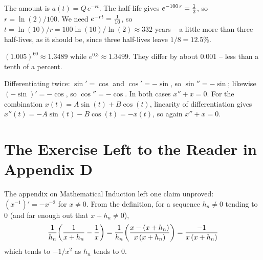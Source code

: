  The amount is $a(t) = Q\, e^{-r t}$. The half-life gives
$e^{-100\, r} = {1 \over 2}$, so $r = \ln(2)/100$. We need
$e^{-r t} = {1 \over 10}$, so
$t = \ln(10)/r = 100 \ln(10)/\ln(2) \approx 332$ years -- a little more
than three half-lives, as it should be, since three half-lives leave
$1/8 = 12.5$\%.

 $(1.005)^{60} \approx 1.3489$ while $e^{0.3} \approx 1.3499$. They
differ by about $0.001$ -- less than a tenth of a percent.

 Differentiating twice: $\sin' = \cos$ and $\cos' = -\sin$, so
$\sin'' = -\sin$; likewise $(-\sin)' = -\cos$, so
$\cos'' = -\cos$. In both cases $x'' + x = 0$. For the combination
$x(t) = A \sin(t) + B \cos(t)$, linearity of differentiation gives
$x''(t) = -A \sin(t) - B \cos(t) = -x(t)$, so again $x'' + x = 0$.

\section{The Exercise Left to the Reader in Appendix D}
The appendix on Mathematical Induction left one claim unproved:
$(x^{-1})' = -x^{-2}$ for $x \ne 0$. From the definition, for a sequence
$h_n \ne 0$ tending to $0$ (and far enough out that $x + h_n \ne 0$),
$$
{1 \over h_n} \biggl( {1 \over x + h_n} - {1 \over x} \biggr)
= {1 \over h_n} \biggl( {x - (x + h_n) \over x\,(x + h_n)} \biggr)
= {-1 \over x\,(x + h_n)}
$$
which tends to $-1/x^2$ as $h_n$ tends to $0$.

\vfil
